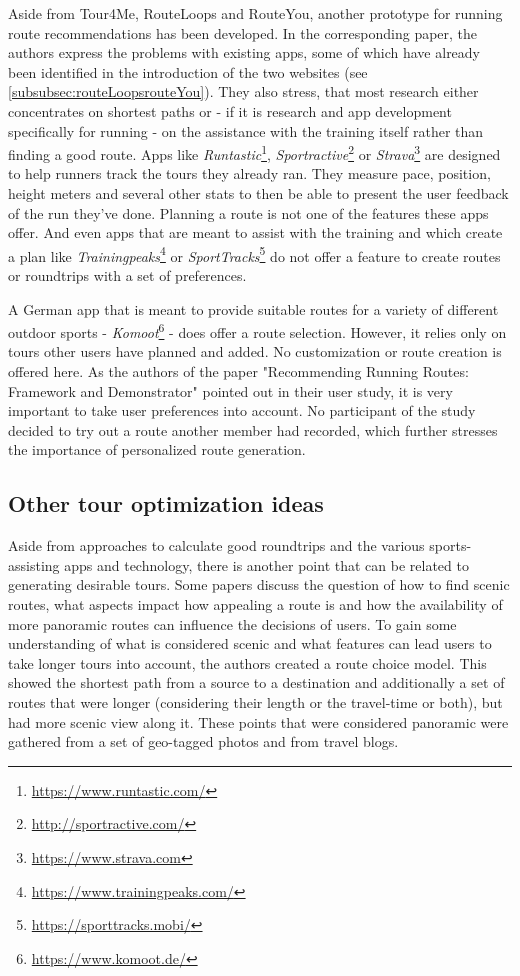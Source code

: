 Aside from Tour4Me, RouteLoops and RouteYou, another prototype for running route recommendations has been developed.
In the corresponding paper\cite{loepp_recommending_nodate}, the authors express the problems with existing apps, some of which have already been identified in the introduction of the two websites (see \ref{subsubsec:routeLoopsrouteYou}).
They also stress, that most research either concentrates on shortest paths or - if it is research and app development specifically for running - on the assistance with the training itself rather than finding a good route.
Apps like \textit{Runtastic}\footnote{\url{https://www.runtastic.com/}}, \textit{Sportractive}\footnote{\url{http://sportractive.com/}} or \textit{Strava}\footnote{\url{https://www.strava.com}} are designed to help runners track the tours they already ran. 
They measure pace, position, height meters and several other stats to then be able to present the user feedback of the run they've done. 
Planning a route is not one of the features these apps offer.
And even apps that are meant to assist with the training and which create a plan like \textit{Trainingpeaks}\footnote{\url{https://www.trainingpeaks.com/}} or \textit{SportTracks}\footnote{\url{https://sporttracks.mobi/}} do not offer a feature to create routes or roundtrips with a set of preferences\cite{loepp_recommending_nodate}.

A German app that is meant to provide suitable routes for a variety of different outdoor sports - \textit{Komoot}\footnote{\url{https://www.komoot.de/}} - does offer a route selection. 
However, it relies only on tours other users have planned and added. No customization or route creation is offered here. 
As the authors of the paper "Recommending Running Routes: Framework and Demonstrator"\cite{loepp_recommending_nodate} pointed out in their user study, it is very important to take user preferences into account. 
No participant of the study decided to try out a route another member had recorded, which further stresses the importance of personalized route generation\cite{loepp_recommending_nodate}.

\subsection{Other tour optimization ideas}
\label{subsec:otherTourOptimization}

Aside from approaches to calculate good roundtrips and the various sports-assisting apps and technology, there is another point that can be related to generating desirable tours.
Some papers discuss the question of how to find scenic routes, what aspects impact how appealing a route is and how the availability of more panoramic routes can influence the decisions of users.
To gain some understanding of what is considered scenic and what features can lead users to take longer tours into account, the authors created a route choice model.
This showed the shortest path from a source to a destination and additionally a set of routes that were longer (considering their length or the travel-time or both), but had more scenic view along it.
These points that were considered panoramic were gathered from a set of geo-tagged photos and from travel blogs. \cite{alivand_analyzing_2015}

